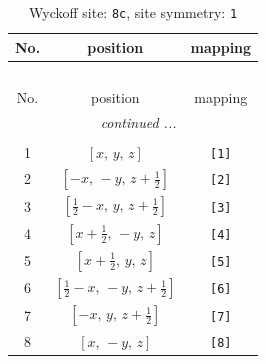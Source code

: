 \documentclass[fleqn,8pt]{jsarticle}
\begin{document}
\renewcommand{\arraystretch}{1.2}
\begin{longtable}{ccc}
\caption{Wyckoff site: {\tt 8c}, site symmetry: {\tt 1}}
 \\
 \hline \hline
No. & position & mapping \\ \hline \endfirsthead

\multicolumn{2}{l}{\tablename\ \thetable{}} \\
 \hline \hline
No. & position & mapping \\ \hline \endhead

 \hline \hline
\multicolumn{2}{r}{\footnotesize\it continued ...} \\ \endfoot

 \hline \hline
\multicolumn{2}{r}{} \\ \endlastfoot

1 & $\left[ x,\, y,\, z \right]$ & {\tt [1]} \\ \hline
2 & $\left[ - x,\, - y,\, z + \frac{1}{2} \right]$ & {\tt [2]} \\ \hline
3 & $\left[ \frac{1}{2} - x,\, y,\, z + \frac{1}{2} \right]$ & {\tt [3]} \\ \hline
4 & $\left[ x + \frac{1}{2},\, - y,\, z \right]$ & {\tt [4]} \\ \hline
5 & $\left[ x + \frac{1}{2},\, y,\, z \right]$ & {\tt [5]} \\ \hline
6 & $\left[ \frac{1}{2} - x,\, - y,\, z + \frac{1}{2} \right]$ & {\tt [6]} \\ \hline
7 & $\left[ - x,\, y,\, z + \frac{1}{2} \right]$ & {\tt [7]} \\ \hline
8 & $\left[ x,\, - y,\, z \right]$ & {\tt [8]} \\
\end{longtable}
\end{document}
